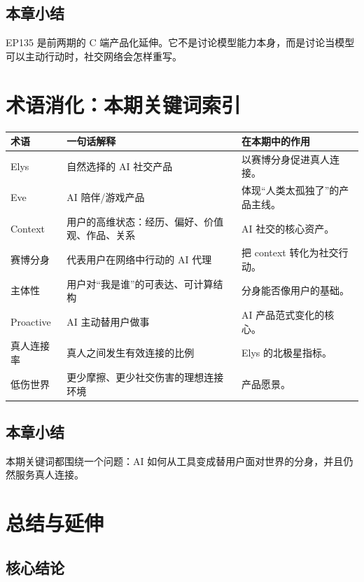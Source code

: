 \documentclass[a4paper]{article}
\begin{document}
\subsection{本章小结}

EP135 是前两期的 C 端产品化延伸。它不是讨论模型能力本身，而是讨论当模型可以主动行动时，社交网络会怎样重写。

\section{术语消化：本期关键词索引}

\begin{longtable}{p{}p{}p{}}
\toprule
术语 & 一句话解释 & 在本期中的作用 \\
\midrule
Elys & 自然选择的 AI 社交产品 & 以赛博分身促进真人连接。 \\
Eve & AI 陪伴/游戏产品 & 体现“人类太孤独了”的产品主线。 \\
Context & 用户的高维状态：经历、偏好、价值观、作品、关系 & AI 社交的核心资产。 \\
赛博分身 & 代表用户在网络中行动的 AI 代理 & 把 context 转化为社交行动。 \\
主体性 & 用户对“我是谁”的可表达、可计算结构 & 分身能否像用户的基础。 \\
Proactive & AI 主动替用户做事 & AI 产品范式变化的核心。 \\
真人连接率 & 真人之间发生有效连接的比例 & Elys 的北极星指标。 \\
低伤世界 & 更少摩擦、更少社交伤害的理想连接环境 & 产品愿景。 \\
\bottomrule
\end{longtable}

\subsection{本章小结}

本期关键词都围绕一个问题：AI 如何从工具变成替用户面对世界的分身，并且仍然服务真人连接。

\section{总结与延伸}

\subsection{核心结论}
\end{document}
